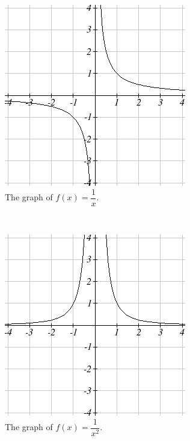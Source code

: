 \begin{figure}[!ht]
    \centering
    \begin{subfigure}[b]{0.4\textwidth}
			\includegraphics[width=\textwidth]{img/chap1/sec1-5/image070.png}
			\caption{The graph of $f(x)=\dfrac{1}{x}$.}
    \end{subfigure}
    ~
    \begin{subfigure}[b]{0.4\textwidth}
			\includegraphics[width=\textwidth]{img/chap1/sec1-5/image069.png}
			\caption{The graph of $f(x)=\dfrac{1}{x^2}$.}
    \end{subfigure}
		\caption{}
		\label{fig:reciprocalgraphs}
\end{figure}

